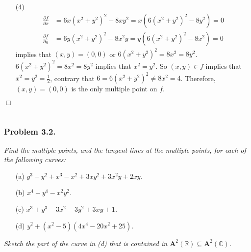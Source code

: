 \documentclass{article}
\begin{document}
\begin{enumerate}
\item[(4)]
  \begin{align*}
    \frac{\partial f}{\partial x} &= 6x(x^2+y^2)^2 - 8xy^2 = x(6(x^2+y^2)^2 - 8y^2) = 0 \\
    \frac{\partial f}{\partial y} &= 6y(x^2+y^2)^2 - 8x^2y = y(6(x^2+y^2)^2 - 8x^2) = 0
  \end{align*}
  implies that $(x,y) = (0,0)$
  or $6(x^2+y^2)^2 = 8x^2 = 8y^2$.
  $6(x^2+y^2)^2 = 8x^2 = 8y^2$ implies that $x^2 = y^2$.
  So $(x,y) \in f$ implies that $x^2 = y^2 = \frac{1}{2}$,
  contrary that $6 = 6(x^2+y^2)^2 \neq 8x^2 = 4$.
  Therefore, $(x,y) = (0,0)$ is the only multiple point on $f$.
\end{enumerate}
$\Box$ \\\\






\subsubsection*{Problem 3.2.}
\emph{Find the multiple points, and the tangent lines at the multiple points,
for each of the following curves:}
\begin{enumerate}
\item[(a)]
  \emph{$y^3 - y^2 + x^3 - x^2 + 3xy^2 + 3x^2y + 2xy$.}

\item[(b)]
  \emph{$x^4 + y^4 - x^2y^2$.}

\item[(c)]
  \emph{$x^3 + y^3 - 3x^2 - 3y^2 + 3xy + 1$.}

\item[(d)]
  \emph{$y^2 + (x^2 - 5)(4x^4 - 20x^2 + 25)$.}
\end{enumerate}
\emph{Sketch the part of the curve in (d)
that is contained in $\mathbf{A}^{2}(\mathbb{R}) \subseteq \mathbf{A}^{2}(\mathbb{C})$.} \\
\end{document}

